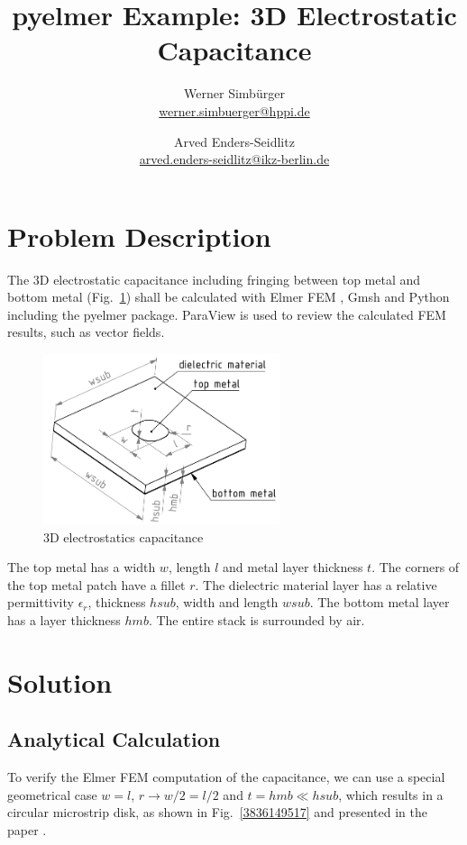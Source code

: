 \documentclass[10pt,a4paper,titlepage]{article}
\author{
	Werner Simbürger\\ \href{mailto:werner.simbuerger@hppi.de}{werner.simbuerger@hppi.de}
	\and
	Arved Enders-Seidlitz \\ \href{mailto:arved.enders-seidlitz@ikz-berlin.de}{arved.enders-seidlitz@ikz-berlin.de}}
\title{pyelmer Example: 3D Electrostatic Capacitance}
\newcommand{\fig}[1]{Fig.~\ref{#1}}
\begin{document}
	\maketitle
	\tableofcontents
	\clearpage
	\section{Problem Description}
	
	The 3D electrostatic capacitance including fringing between top metal and bottom metal (\fig{3835848427}) shall be calculated with Elmer FEM \cite{ElmerFEM}, Gmsh \cite{Gmsh} and Python \cite{WinPython} including the pyelmer \cite{pyelmer} package. ParaView \cite{ParaView} is used to review the calculated FEM results, such as vector fields.
	
	
	\begin{figure}[H]
		\begin{center}
			\includegraphics[width=!, height=5cm, angle=0]{./fig/example_01.pdf}
			\caption{3D electrostatics capacitance}
			\label{3835848427}
		\end{center}
	\end{figure}
	
	\noindent
	The top metal has a width $w$, length $l$ and metal layer thickness $t$. The corners of the top metal patch have a fillet $r$.
	The dielectric material layer has a relative permittivity $\epsilon_r$, thickness $hsub$, width and length $wsub$.
	The bottom metal layer has a layer thickness $hmb$. The entire stack is surrounded by air.
	
	\section{Solution}
	
	\subsection{Analytical Calculation}
	
	To verify the Elmer FEM computation of the capacitance, we can use a special geometrical case $w = l$, $r \rightarrow w/2 = l/2$ and $t=hmb \ll hsub$, which results in a circular microstrip disk, as shown in \fig{3836149517} and presented in the paper \cite{1130017}.
	
\end{document}
